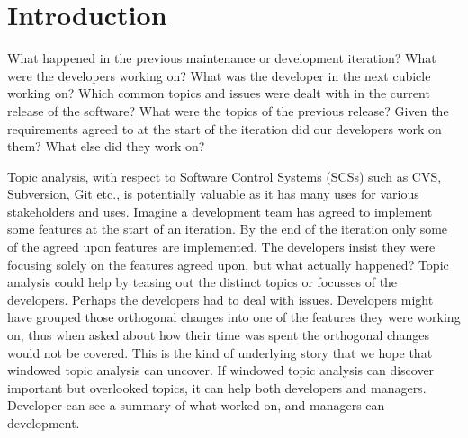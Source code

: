 \documentclass[times, 10pt,twocolumn]{article}
\newcommand{\lda}{Latent Dirichlet Allocation}
\begin{document}
\begin{abstract}

\end{abstract}

\section{Introduction}



% 





What happened in the previous maintenance or development iteration? What were the developers
working on? What was the developer in the next cubicle working on?
Which common topics and issues were dealt with in the current
release of the software? What were the topics of the previous release?
Given the requirements agreed to at the start of the iteration did our
developers work on them? What else did they work on?

Topic analysis, with respect to Software Control Systems (SCSs) such
as CVS, Subversion, Git etc., is potentially valuable as it has many
uses for various stakeholders and uses.  Imagine a development team
has agreed to implement some features at the start of an iteration. By
the end of the iteration only some of the agreed upon features are
implemented. The developers insist they were focusing solely on the
features agreed upon, but what actually happened? Topic analysis could
help by teasing out the distinct topics or focusses of the
developers. Perhaps the developers had to deal with issues.
Developers might have grouped those orthogonal changes into one of the
features they were working on, thus when asked about how their time
was spent the orthogonal changes would not be covered. This is the kind of underlying story that we
hope that windowed topic analysis can uncover. If windowed topic
analysis can discover important but overlooked topics, it can help
both developers and managers. Developer can see a summary of what
worked on, and managers can development.
\end{document}
